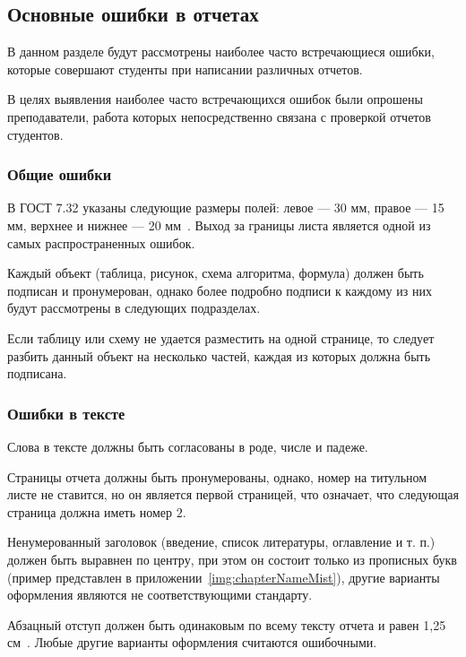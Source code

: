\begin{appendices}
	\chapter{}
	\label{app:Mist}
	\section{Основные ошибки в отчетах}
	В данном разделе будут рассмотрены наиболее часто встречающиеся ошибки, которые совершают студенты при написании различных отчетов.
	
	В целях выявления наиболее часто встречающихся ошибок были опрошены преподаватели, работа которых непосредственно связана с проверкой отчетов студентов.
	
	\subsection{Общие ошибки}
	В ГОСТ 7.32 указаны следующие размеры полей: левое --- 30 мм, правое --- 15 мм, верхнее и нижнее --- 20 мм~\cite{GOST732}. Выход за границы листа является одной из самых распространенных ошибок.
	
	Каждый объект (таблица, рисунок, схема алгоритма, формула) должен быть подписан и пронумерован, однако более подробно подписи к каждому из них будут рассмотрены в следующих подразделах.
	
	Если таблицу или схему не удается разместить на одной странице, то следует разбить данный объект на несколько частей, каждая из которых должна быть подписана.
	
	\subsection{Ошибки в тексте}
	Слова в тексте должны быть согласованы в роде, числе и падеже.
	
	Страницы отчета должны быть пронумерованы, однако, номер на титульном листе не ставится, но он является первой страницей, что означает, что следующая страница должна иметь номер ${2}$.
	
	Ненумерованный заголовок (введение, список литературы, оглавление и т. п.) должен быть выравнен по центру, при этом он состоит только из прописных букв (пример представлен в приложении~\ref{img:chapterNameMist}), другие варианты оформления являются не соответствующими стандарту.
	
	Абзацный отступ должен быть одинаковым по всему тексту отчета и равен 1,25 см~\cite{GOST732}. Любые другие варианты оформления считаются ошибочными.
	

\end{appendices}
